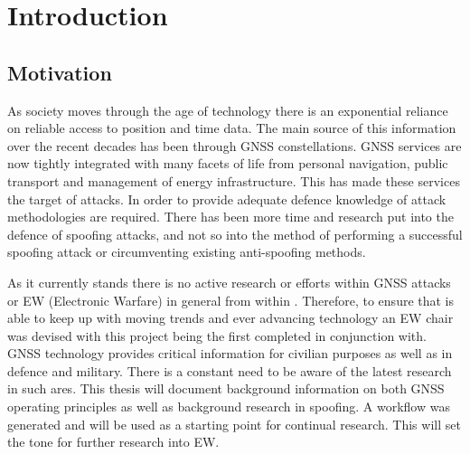 
\chapter{Introduction}\label{chapter:firstchapter} %

\label{Chapter1} %

\section{Motivation}\label{sec:Motivation}


As society moves through the age of technology there is an exponential reliance on reliable access to position and time data. The main source of this information over the
recent decades has been through GNSS constellations. GNSS services are now tightly integrated with many facets of life from personal navigation, public transport and
management of energy infrastructure. This has made these services the target of attacks. In order to provide adequate defence knowledge of attack methodologies are
required. 
There has been more time and research put into the defence of spoofing attacks, and not so into the method of performing a successful spoofing attack or
circumventing existing anti-spoofing methods. 

As it currently stands there is no active research or efforts within GNSS attacks or EW (Electronic Warfare) in general from within \univname. Therefore, to ensure that
\univname  is able to keep up with moving trends and
ever advancing technology an EW chair was devised with this project being the first completed in conjunction with. GNSS technology provides critical information for
civilian purposes as well as in defence and military. There is a constant need to be aware of the latest research in such ares.   
This thesis will document background information on both GNSS operating principles as well as background research in
spoofing. A workflow was generated and will be used as a starting point for continual research. This will set the tone for further research into EW.

